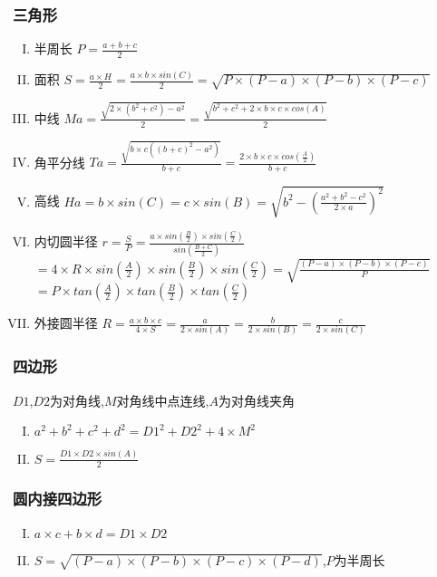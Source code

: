 \subsubsection{三角形}
\begin{enumerate}[I. ]
	\item 半周长 $P=\frac{a+b+c}{2}$
	\item 面积 $S=\frac{a\times H}{2}=\frac{a\times b\times sin(C)}{2}=\sqrt{P\times (P-a)\times (P-b)\times (P-c)}$
	\item 中线 $Ma=\frac{\sqrt{2\times (b^{2}+c^{2})-a^{2}}}{2}=\frac{\sqrt{b^{2}+c^{2}+2\times b\times c\times cos(A)}}{2}$
	\item 角平分线 $Ta=\frac{\sqrt{b\times c((b+c)^{2}-a^{2})}}{b+c}=\frac{2\times b\times c\times cos(\frac{A}{2})}{b+c}$
	\item 高线 $Ha=b\times sin(C)=c\times sin(B)=\sqrt{b^{2}-(\frac{a^{2}+b^{2}-c^{2}}{2\times a})^{2}}$
	\item 内切圆半径 $r=\frac{S}{P}=\frac{a\times sin(\frac{B}{2})\times sin(\frac{C}{2})}{sin(\frac{B+C}{2})}$\\
               $=4\times R\times sin(\frac{A}{2})\times sin(\frac{B}{2})\times sin(\frac{C}{2})=\sqrt{\frac{(P-a)\times (P-b)\times (P-c)}{P}}$\\
               $=P\times tan(\frac{A}2)\times tan(\frac{B}2)\times tan(\frac{C}2)$
    \item 外接圆半径 $R=\frac{a\times b\times c}{4\times S}=\frac{a}{2\times sin(A)}=\frac{b}{2\times sin(B)}=\frac{c}{2\times sin(C)}$
\end{enumerate}
\subsubsection{四边形}
$D1$,$D2$为对角线,$M$对角线中点连线,$A$为对角线夹角
\begin{enumerate}[I. ]
	\item $a^{2}+b^{2}+c^{2}+d^{2}=D1^{2}+D2^{2}+4\times M^{2}$
	\item $S=\frac{D1\times D2\times sin(A)}2$\\
\end{enumerate}
\subsubsection{圆内接四边形}
\begin{enumerate}[I. ]
	\item $a\times c+b\times d=D1\times D2$
	\item $S=\sqrt{(P-a)\times (P-b)\times (P-c)\times (P-d)}$,$P$为半周长
\end{enumerate}
